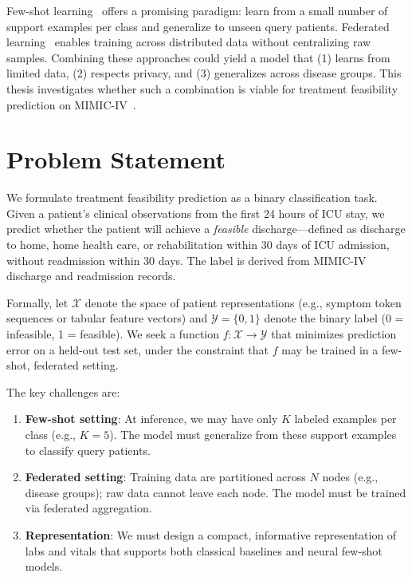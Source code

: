 Few-shot learning~\cite{snell2017prototypical,vinyals2016matching} offers a promising paradigm: learn from a small number of support examples per class and generalize to unseen query patients. Federated learning~\cite{mcmahan2017communication} enables training across distributed data without centralizing raw samples. Combining these approaches could yield a model that (1) learns from limited data, (2) respects privacy, and (3) generalizes across disease groups. This thesis investigates whether such a combination is viable for treatment feasibility prediction on MIMIC-IV~\cite{johnson2023mimic}.

\section{Problem Statement}

We formulate treatment feasibility prediction as a binary classification task. Given a patient's clinical observations from the first 24 hours of ICU stay, we predict whether the patient will achieve a \emph{feasible} discharge---defined as discharge to home, home health care, or rehabilitation within 30 days of ICU admission, without readmission within 30 days. The label is derived from MIMIC-IV discharge and readmission records.

Formally, let $\mathcal{X}$ denote the space of patient representations (e.g., symptom token sequences or tabular feature vectors) and $\mathcal{Y} = \{0, 1\}$ denote the binary label (0 = infeasible, 1 = feasible). We seek a function $f: \mathcal{X} \to \mathcal{Y}$ that minimizes prediction error on a held-out test set, under the constraint that $f$ may be trained in a few-shot, federated setting.

The key challenges are:
\begin{enumerate}
\item \textbf{Few-shot setting}: At inference, we may have only $K$ labeled examples per class (e.g., $K=5$). The model must generalize from these support examples to classify query patients.
\item \textbf{Federated setting}: Training data are partitioned across $N$ nodes (e.g., disease groups); raw data cannot leave each node. The model must be trained via federated aggregation.
\item \textbf{Representation}: We must design a compact, informative representation of labs and vitals that supports both classical baselines and neural few-shot models.
\end{enumerate}

